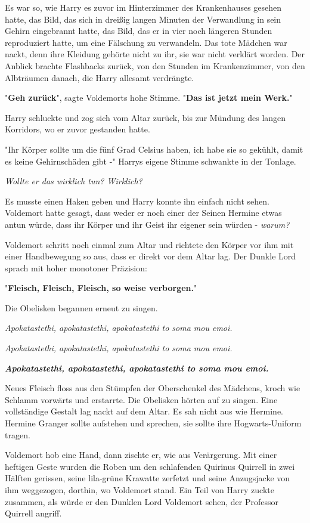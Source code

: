 {Es war so, wie Harry es zuvor im Hinterzimmer des Krankenhauses gesehen hatte, das Bild, das sich in dreißig langen Minuten der Verwandlung in sein Gehirn eingebrannt hatte, das Bild, das er in vier noch längeren Stunden reproduziert hatte, um eine Fälschung zu verwandeln. Das tote Mädchen war nackt, denn ihre Kleidung gehörte nicht zu ihr, sie war nicht verklärt worden. Der Anblick brachte Flashbacks zurück, von den Stunden im Krankenzimmer, von den Albträumen danach, die Harry allesamt verdrängte.

"\textbf{Geh zurück}", sagte Voldemorts hohe Stimme. "\textbf{Das ist jetzt mein Werk.}"

Harry schluckte und zog sich vom Altar zurück, bis zur Mündung des langen Korridors, wo er zuvor gestanden hatte.

"Ihr Körper sollte um die fünf Grad Celsius haben, ich habe sie so gekühlt, damit es keine Gehirnschäden gibt -" Harrys eigene Stimme schwankte in der Tonlage.

\emph{Wollte er das wirklich tun? Wirklich?}

Es musste einen Haken geben und Harry konnte ihn einfach nicht sehen. Voldemort hatte gesagt, dass weder er noch einer der Seinen Hermine etwas antun würde, dass ihr Körper und ihr Geist ihr eigener sein würden - \emph{warum?}

Voldemort schritt noch einmal zum Altar und richtete den Körper vor ihm mit einer Handbewegung so aus, dass er direkt vor dem Altar lag. Der Dunkle Lord sprach mit hoher monotoner Präzision:

"\textbf{Fleisch, Fleisch, Fleisch, so weise verborgen.}"

Die Obelisken begannen erneut zu singen.

\emph{Apokatastethi, apokatastethi, apokatastethi to soma mou emoi.}

\emph{Apokatastethi, apokatastethi, apokatastethi to soma mou emoi.}

\textbf{\emph{Apokatastethi, apokatastethi, apokatastethi to soma mou emoi.}}

Neues Fleisch floss aus den Stümpfen der Oberschenkel des Mädchens, kroch wie Schlamm vorwärts und erstarrte. Die Obelisken hörten auf zu singen. Eine vollständige Gestalt lag nackt auf dem Altar. Es sah nicht aus wie Hermine. Hermine Granger sollte aufstehen und sprechen, sie sollte ihre Hogwarts-Uniform tragen.

Voldemort hob eine Hand, dann zischte er, wie aus Verärgerung. Mit einer heftigen Geste wurden die Roben um den schlafenden Quirinus Quirrell in zwei Hälften gerissen, seine lila-grüne Krawatte zerfetzt und seine Anzugsjacke von ihm weggezogen, dorthin, wo Voldemort stand. Ein Teil von Harry zuckte zusammen, als würde er den Dunklen Lord Voldemort sehen, der Professor Quirrell angriff.

}
